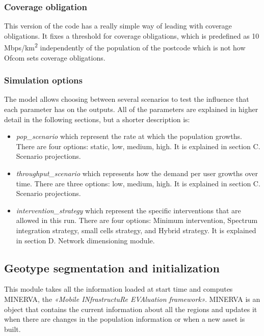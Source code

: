 \subsubsection*{Coverage obligation}
This version of the code has a really simple way of leading with coverage obligations. It fixes a threshold for coverage obligations, which is predefined as 10 Mbps/km\textsuperscript{2} independently of the population of the postcode which is not how Ofcom sets coverage obligations.\par


\subsubsection*{Simulation options}
The model allows choosing between several scenarios to test the influence that each parameter has on the outputs. All of the parameters are explained in higher detail in the following sections, but a shorter description is:\par

\begin{itemize}
	\item \textit{pop\_scenario} which represent the rate at which the population growths. There are four options: static, low, medium, high. It is explained in section C. Scenario projections.\par

	\item \textit{throughput\_scenario} which represents how the demand per user growths over time. There are three options: low, medium, high. It is explained in section C. Scenario projections.\par

	\item \textit{intervention\_strategy }which represent the specific interventions that are allowed in this run. There are four options: Minimum intervention, Spectrum integration strategy, small cells strategy, and Hybrid strategy. It is explained in section D. Network dimensioning module.\par
\end{itemize}

\subsection{Geotype segmentation and initialization}
This module takes all the information loaded at start time and computes MINERVA, the \textit{«Mobile INfrastructuRe EVAluation framework». }MINERVA is an object that contains the current information about all the regions and updates it when there are changes in the population information or when a new asset is built. \par

